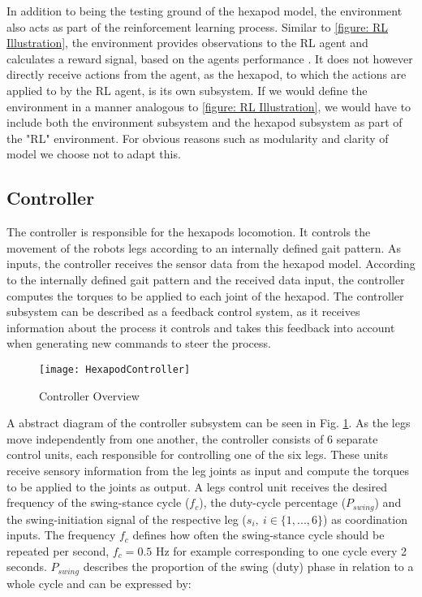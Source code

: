 In addition to being the testing ground of the hexapod model, the environment also acts as part of the reinforcement learning process.
Similar to \ref{figure: RL Illustration}, the environment provides observations to the RL agent and calculates a reward signal, based on the agents performance .
It does not however directly receive actions from the agent, as the hexapod, to which the actions are applied to by the RL agent, is its own subsystem.
If we would define the environment in a manner analogous to \ref{figure: RL Illustration}, we would have to include both the environment subsystem and the hexapod subsystem as part of the "RL" environment.
For obvious reasons such as modularity and clarity of model we choose not to adapt this.

\subsection{Controller}
The controller is responsible for the hexapods locomotion.
It controls the movement of the robots legs according to an internally defined gait pattern.
As inputs, the controller receives the sensor data from the hexapod model.
According to the internally defined gait pattern and the received data input, the controller computes the torques to be applied to each joint of the hexapod.
The controller subsystem can be described as a feedback control system, as it receives information about the process it controls and takes this feedback into account when generating new commands to steer the process.

\begin{figure}
	\centerline{\texttt{[image: HexapodController]}}
	\caption{Controller Overview}
	\label{figure: Controller Overview}
\end{figure}

A abstract diagram of the controller subsystem can be seen in Fig. \ref{figure: Controller Overview}.
As the legs move independently from one another, the controller consists of 6 separate control units, each responsible for controlling one of the six legs.
These units receive sensory information from the leg joints as input and compute the torques to be applied to the joints as output.
A legs control unit receives the desired frequency of the swing-stance cycle ($f_{c}$), the duty-cycle percentage ($P_{swing}$) and the swing-initiation signal of the respective leg ($s_i,\ i \in \{1,...,6\}$) as coordination inputs.
The frequency $f_{c}$ defines how often the swing-stance cycle should be repeated per second, $f_{c} = 0.5 \text{ Hz}$ for example corresponding to one cycle every 2 seconds.
$P_{swing}$ describes the proportion of the swing (duty) phase in relation to a whole cycle \parencite{qiu2023adaptive} and can be expressed by: 

